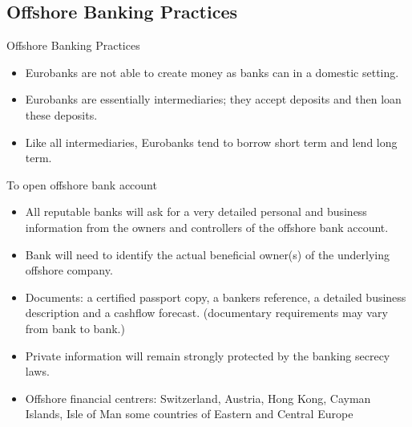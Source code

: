 \documentclass[international_finance_p2.tex]{subfiles}
\begin{document}
\subsection{Offshore Banking Practices}
\begin{frame}{Offshore Banking Practices}
\begin{itemize}[<+->]
\item
Eurobanks are not able to create money as banks can in a domestic setting. 
\item
Eurobanks are essentially intermediaries; they accept deposits and then loan these deposits. 
\item
Like all intermediaries, Eurobanks tend to borrow short term and lend long term.
\end{itemize}
\end{frame}
\begin{frame}[shrink=10]{To open offshore bank account}
\begin{itemize}[<+->]
\item
All reputable banks will ask for a very detailed personal and business information from the owners and controllers of the offshore bank account.
\item
Bank will need to identify the actual beneficial owner(s) of the underlying offshore company.
\item
Documents: a certified passport copy, a bankers reference, a detailed business description and a cashflow forecast. (documentary requirements may vary from bank to bank.) 
\item
Private information will remain strongly protected by the banking secrecy laws.
\item
Offshore financial centrers: Switzerland, Austria, Hong Kong, Cayman Islands, Isle of Man some countries of Eastern and Central Europe
\end{itemize}
\end{frame}
\end{document}

